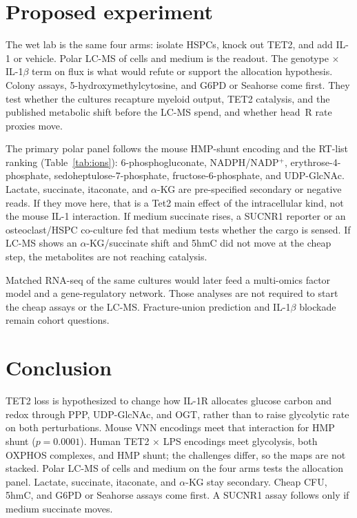 \documentclass[11pt]{article}
\begin{document}
\section*{Proposed experiment}

The wet lab is the same four arms: isolate HSPCs, knock out TET2, and add IL-1 or
vehicle. Polar LC-MS of cells and medium is the readout. The genotype $\times$
IL-1$\beta$ term on flux is what would refute or support the allocation hypothesis.
Colony assays, 5-hydroxymethylcytosine, and G6PD or Seahorse come first. They test
whether the cultures recapture myeloid output, TET2 catalysis, and the published
metabolic shift before the LC-MS spend, and whether head~R rate proxies move.

The primary polar panel follows the mouse HMP-shunt encoding and the RT-list ranking
(Table~\ref{tab:ions}): 6-phosphogluconate, NADPH/NADP$^{+}$, erythrose-4-phosphate,
sedoheptulose-7-phosphate, fructose-6-phosphate, and UDP-GlcNAc. Lactate, succinate,
itaconate, and $\alpha$-KG are pre-specified secondary or negative reads. If they move
here, that is a Tet2 main effect of the intracellular kind, not the mouse IL-1
interaction. If medium succinate rises, a SUCNR1 reporter or an osteoclast/HSPC
co-culture fed that medium tests whether the cargo is sensed. If LC-MS shows an
$\alpha$-KG/succinate shift and 5hmC did not move at the cheap step, the metabolites are
not reaching catalysis.

Matched RNA-seq of the same cultures would later feed a multi-omics factor model and a
gene-regulatory network. Those analyses are not required to start the cheap assays or
the LC-MS. Fracture-union prediction and IL-1$\beta$ blockade remain cohort questions.

\section*{Conclusion}

TET2 loss is hypothesized to change how IL-1R allocates glucose carbon and redox through
PPP, UDP-GlcNAc, and OGT, rather than to raise glycolytic rate on both perturbations.
Mouse VNN encodings meet that interaction for HMP shunt ($p=0.0001$). Human TET2
$\times$ LPS encodings meet glycolysis, both OXPHOS complexes, and HMP shunt; the
challenges differ, so the maps are not stacked. Polar LC-MS of cells and medium on the
four arms tests the allocation panel. Lactate, succinate, itaconate, and $\alpha$-KG stay
secondary. Cheap CFU, 5hmC, and G6PD or Seahorse assays come first. A SUCNR1 assay
follows only if medium succinate moves.



\end{document}
